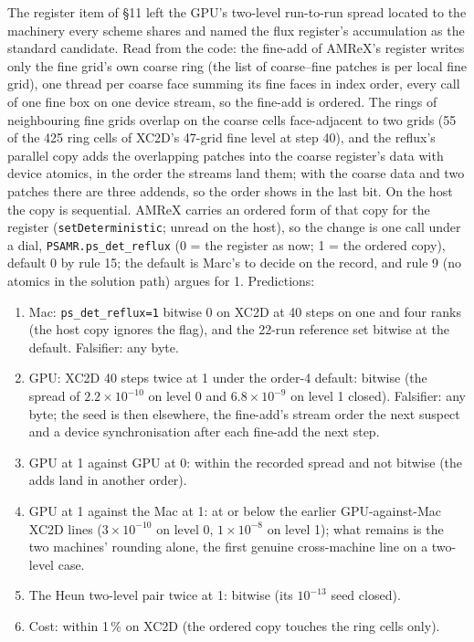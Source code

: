 \documentclass[11pt,a4paper]{article}
\newcommand{\code}[1]{\texttt{\small #1}}
\begin{document}
The register item of \S11 left the GPU's two-level run-to-run spread
located to the machinery every scheme shares and named the flux
register's accumulation as the standard candidate.  Read from the
code: the fine-add of AMReX's register writes only the fine grid's own
coarse ring (the list of coarse--fine patches is per local fine grid),
one thread per coarse face summing its fine faces in index order, every
call of one fine box on one device stream, so the fine-add is ordered.
The rings of neighbouring fine grids overlap on the coarse cells
face-adjacent to two grids (55 of the 425 ring cells of XC2D's 47-grid
fine level at step 40), and the reflux's parallel copy adds the
overlapping patches into the coarse register's data with device
atomics, in the order the streams land them; with the coarse data and
two patches there are three addends, so the order shows in the last
bit.  On the host the copy is sequential.  AMReX carries an ordered
form of that copy for the register (\code{setDeterministic}; unread on
the host), so the change is one call under a dial,
\code{PSAMR.ps\_det\_reflux} (0 = the register as now; 1 = the ordered
copy), default 0 by rule 15; the default is Marc's to decide on the
record, and rule 9 (no atomics in the solution path) argues for 1.
Predictions:
\begin{enumerate}[nosep]
\item Mac: \code{ps\_det\_reflux=1} bitwise 0 on XC2D at 40 steps on
      one and four ranks (the host copy ignores the flag), and the
      22-run reference set bitwise at the default.  Falsifier: any
      byte.
\item GPU: XC2D 40 steps twice at 1 under the order-4 default: bitwise
      (the spread of $2.2\times10^{-10}$ on level 0 and
      $6.8\times10^{-9}$ on level 1 closed).  Falsifier: any byte; the
      seed is then elsewhere, the fine-add's stream order the next
      suspect and a device synchronisation after each fine-add the next
      step.
\item GPU at 1 against GPU at 0: within the recorded spread and not
      bitwise (the adds land in another order).
\item GPU at 1 against the Mac at 1: at or below the earlier
      GPU-against-Mac XC2D lines ($3\times10^{-10}$ on level 0,
      $1\times10^{-8}$ on level 1); what remains is the two machines'
      rounding alone, the first genuine cross-machine line on a
      two-level case.
\item The Heun two-level pair twice at 1: bitwise (its
      $10^{-13}$ seed closed).
\item Cost: within 1\,\% on XC2D (the ordered copy touches the ring
      cells only).
\end{enumerate}
\end{document}
